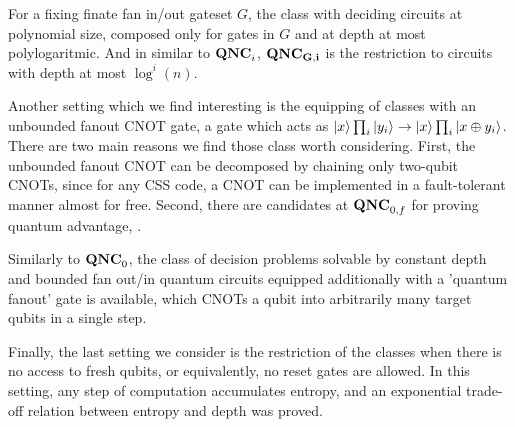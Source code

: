 \documentclass[manuscript,screen,review]{acmart}
\begin{document}
{\begin{definition}[$\QNCG{}$]
  For a fixing finate fan in/out gateset $G$, the class with deciding circuits at polynomial size, composed only for gates in $G$ and at depth at most polylogaritmic. And in similar to $\mathbf{QNC}_{i}{}$, $\mathbf{QNC_{G,i}}{}$ is the restriction to circuits with depth at most $\log^{i}(n)$.  
\end{definition}

Another setting which we find interesting is the equipping of classes with an unbounded fanout CNOT gate, a gate which acts as $\ket{x}\prod_{i}\ket{y_{i}} \rightarrow \ket{x}\prod_{i}\ket{x \oplus y_{i}}$. There are two main reasons we find those class worth considering. First, the unbounded fanout CNOT can be decomposed by chaining only two-qubit CNOTs, since for any CSS code, a CNOT can be implemented in a fault-tolerant manner almost for free. Second, there are candidates at $\mathbf{QNC}_{0,f}$ for proving quantum advantage\cite{Bremner_2017}, \cite{Paletta_2024}.


\begin{definition}[$\QNCzef{}$] 
Similarly to $\mathbf{QNC}_{0}{}$, the class of decision problems solvable by constant depth and bounded fan out/in quantum circuits equipped additionally with a 'quantum fanout' gate is available, which CNOTs a qubit into arbitrarily many target qubits in a single step.
\end{definition}

Finally, the last setting we consider is the restriction of the classes when there is no access to fresh qubits, or equivalently, no reset gates are allowed. In this setting, any step of computation accumulates entropy, and an exponential trade-off relation between entropy and depth was proved.

}
\end{document}
